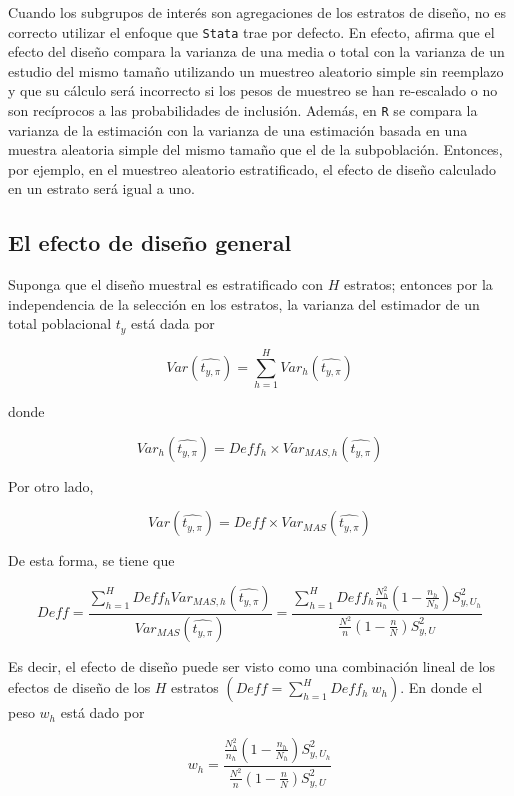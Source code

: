 \documentclass[
  10pt,
  spanish,
]{book}
\begin{document}
Cuando los subgrupos de interés son agregaciones de los estratos de diseño, no es correcto utilizar el enfoque que \texttt{Stata} trae por defecto. En efecto, \citet{Lumley_2010} afirma que el efecto del diseño compara la varianza de una media o total con la varianza de un estudio del mismo tamaño utilizando un muestreo aleatorio simple sin reemplazo y que su cálculo será incorrecto si los pesos de muestreo se han re-escalado o no son recíprocos a las probabilidades de inclusión. Además, en \texttt{R} se compara la varianza de la estimación con la varianza de una estimación basada en una muestra aleatoria simple del mismo tamaño que el de la subpoblación. Entonces, por ejemplo, en el muestreo aleatorio estratificado, el efecto de diseño calculado en un estrato será igual a uno.

\hypertarget{el-efecto-de-diseuxf1o-general}{%
\subsection{El efecto de diseño general}\label{el-efecto-de-diseuxf1o-general}}

Suponga que el diseño muestral es estratificado con \(H\) estratos; entonces por la independencia de la selección en los estratos, la varianza del estimador de un total poblacional \(t_y\) está dada por

\[
Var\left(\widehat{t_{y,\pi}}\right)=\sum_{h=1}^{H}Var_h\left(\widehat{t_{y,\pi}}\right)
\]

donde

\[
{Var}_h\left(\widehat{t_{y,\pi}}\right)={Deff}_h \times {Var}_{MAS,h}\left(\widehat{t_{y,\pi}}\right)
\]

Por otro lado,

\[
Var\left(\widehat{t_{y,\pi}}\right)=Deff \times {Var}_{MAS}\left(\widehat{t_{y,\pi}}\right)
\]

De esta forma, se tiene que

\[
Deff=\frac{\sum_{h=1}^{H}Deff_h{Var}_{MAS,h}\left(\widehat{t_{y,\pi}}\right)}{Var_{MAS}\left(\widehat{t_{y,\pi}}\right)}=\frac{\sum_{h=1}^{H}Deff_h\frac{N_h^2}{n_h}(1-\frac{n_h}{N_h})S_{y,U_h}^2}{\frac{N^2}{n}(1-\frac{n}{N})S_{y,U}^2}
\]

Es decir, el efecto de diseño puede ser visto como una combinación lineal de los efectos de diseño de los \(H\) estratos \((Deff=\sum_{h=1}^{H} Deff_h \ w_h)\). En donde el peso \(w_h\) está dado por

\[
w_h=\frac{\frac{N_h^2}{n_h}(1-\frac{n_h}{N_h})S_{y,U_h}^2}{\frac{N^2}{n}(1-\frac{n}{N})S_{y,U}^2}
\]
\end{document}
